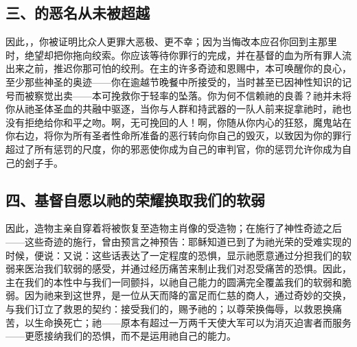 
\subsection{三、的恶名从未被超越}

因此，，你被证明比众人更罪大恶极、更不幸；因为当悔改本应召你回到主那里时，绝望却把你拖向绞索。你应该等待你罪行的完成，并在基督的血为所有罪人流出来之前，推迟你那可怕的绞刑。在主的许多奇迹和恩赐中，本可唤醒你的良心，至少那些神圣的奥迹——你在逾越节晚餐中所接受的，当时甚至已因神性知识的记号而被察觉出卖——本可挽救你于轻率的坠落。你为何不信赖祂的良善？祂并未将你从祂圣体圣血的共融中驱逐，当你与人群和持武器的一队人前来捉拿祂时，祂也没有拒绝给你和平之吻。啊，无可挽回的人！啊，你随从你内心的狂怒，魔鬼站在你右边，将你为所有圣者性命所准备的恶行转向你自己的毁灭，以致因为你的罪行超过了所有惩罚的尺度，你的邪恶使你成为自己的审判官，你的惩罚允许你成为自己的刽子手。\par


\subsection{四、基督自愿以祂的荣耀换取我们的软弱}

因此，造物主亲自穿着将被恢复至造物主肖像的受造物；在施行了神性奇迹之后——这些奇迹的施行，曾由预言之神预告：耶稣知道已到了为祂光荣的受难实现的时候，便说：又说：这些话表达了一定程度的恐惧，显示祂愿意通过分担我们的软弱来医治我们软弱的感受，并通过经历痛苦来制止我们对忍受痛苦的恐惧。因此，主在我们的本性中与我们一同颤抖，以祂自己能力的圆满完全覆盖我们的软弱和脆弱。因为祂来到这世界，是一位从天而降的富足而仁慈的商人，通过奇妙的交换，与我们订立了救恩的契约：接受我们的，赐予祂的；以尊荣换侮辱，以救恩换痛苦，以生命换死亡；祂——原本有超过一万两千天使大军可以为消灭迫害者而服务——更愿接纳我们的恐惧，而不是运用祂自己的能力。\par


